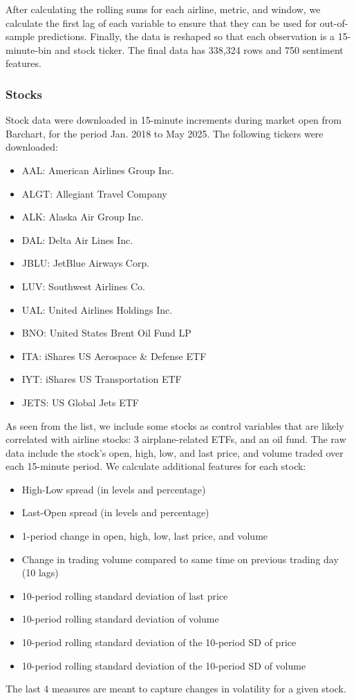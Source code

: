 \documentclass[12pt]{article}
\begin{document}
After calculating the rolling sums for each airline, metric, and window, we calculate the first lag of each variable to ensure that they can be used for out-of-sample predictions. Finally, the data is reshaped so that each observation is a 15-minute-bin and stock ticker. The final data has 338,324 rows and 750 sentiment features.

\subsubsection{Stocks}
Stock data were downloaded in 15-minute increments during market open from Barchart, for the period Jan. 2018 to May 2025. The following tickers were downloaded:
\begin{itemize}
\singlespacing
    \item AAL: American Airlines Group Inc.
    \item ALGT: Allegiant Travel Company
    \item ALK: Alaska Air Group Inc.
    \item DAL: Delta Air Lines Inc.
    \item JBLU: JetBlue Airways Corp.
    \item LUV: Southwest Airlines Co.
    \item UAL: United Airlines Holdings Inc.
    \item BNO: United States Brent Oil Fund LP
    \item ITA: iShares US Aerospace \& Defense ETF
    \item IYT: iShares US Transportation ETF
    \item JETS: US Global Jets ETF
\end{itemize}
As seen from the list, we include some stocks as control variables that are likely correlated with airline stocks: 3 airplane-related ETFs, and an oil fund. The raw data include the stock's open, high, low, and last price, and volume traded over each 15-minute period. We calculate additional features for each stock:
\begin{itemize}
\singlespacing
    \item High-Low spread (in levels and percentage)
    \item Last-Open spread (in levels and percentage)
    \item 1-period change in open, high, low, last price, and volume
    \item Change in trading volume compared to same time on previous trading day (10 lags)
    \item 10-period rolling standard deviation of last price
    \item 10-period rolling standard deviation of volume
    \item 10-period rolling standard deviation of the 10-period SD of price
    \item 10-period rolling standard deviation of the 10-period SD of volume
\end{itemize}
The last 4 measures are meant to capture changes in volatility for a given stock.
\end{document}
